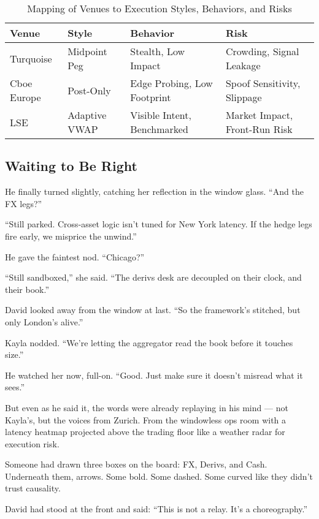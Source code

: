 \begin{table}[H]
  \centering
  \begin{tabular}{|l|l|l|l|}
  \hline
  \textbf{Venue} & \textbf{Style} & \textbf{Behavior} & \textbf{Risk} \\
  \hline
  Turquoise & Midpoint Peg & Stealth, Low Impact & Crowding, Signal Leakage \\
  \hline
  Cboe Europe & Post-Only & Edge Probing, Low Footprint & Spoof Sensitivity, Slippage \\
  \hline
  LSE & Adaptive VWAP & Visible Intent, Benchmarked & Market Impact, Front-Run Risk \\
  \hline
  \end{tabular}
  \caption{Mapping of Venues to Execution Styles, Behaviors, and Risks}
\end{table}






\subsection{Waiting to Be Right}

He finally turned slightly, catching her reflection in the window glass.
“And the FX legs?”

“Still parked. Cross-asset logic isn’t tuned for New York latency. If the hedge legs fire early, we misprice the unwind.”

He gave the faintest nod.
“Chicago?”

“Still sandboxed,” she said. “The derivs desk are decoupled on their clock, and their book.”

David looked away from the window at last.
“So the framework’s stitched, but only London’s alive.”

Kayla nodded.
“We’re letting the aggregator read the book before it touches size.”

He watched her now, full-on.
“Good. Just make sure it doesn’t misread what it sees.”

But even as he said it, the words were already replaying in his mind —
not Kayla’s, but the voices from Zurich.
From the windowless ops room with a latency heatmap projected above the trading floor like a weather 
radar for execution risk.

Someone had drawn three boxes on the board: FX, Derivs, and Cash.
Underneath them, arrows. Some bold. Some dashed. Some curved like they didn’t trust causality.

David had stood at the front and said:
“This is not a relay. It’s a choreography.”

